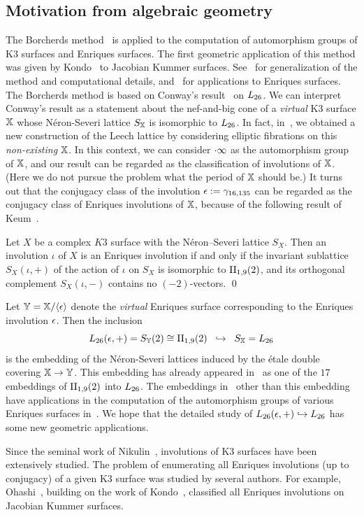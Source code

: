 \documentclass{amsart} %
\begin{document}
\subsection{Motivation from algebraic geometry}\label{subsec:alggeom}
%
The Borcherds method~\cite{MR913200, MR1654763}
is applied to the computation of automorphism groups of K3 surfaces and Enriques surfaces.
The first geometric application of this method was given 
by Kondo~\cite{MR1618132} to Jacobian Kummer surfaces.
See~\cite{MR3456710, MR4759604} for generalization of the method and computational details,
and~\cite{MR4498439, MR4389670} for applications to Enriques surfaces.
The Borcherds method is based on Conway's result~\cite{MR690711} on $L_{26}$. 
We can interpret Conway's result 
as a statement about the nef-and-big cone of a \emph{virtual} K3 surface $\mathord{\mathbb{X}}$
 whose N\'eron-Severi lattice $S_{\mathord{\mathbb{X}}}$ is isomorphic to $L_{26}$.
In fact,
in~\cite{MR4674939}, 
we obtained a new construction of the Leech lattice
by considering elliptic fibrations on this \emph{non-existing} $\mathord{\mathbb{X}}$.
In this context, we can consider $\cdot \infty$ as 
the automorphism group of $\mathord{\mathbb{X}}$,
and our result can be regarded as the classification of involutions of $\mathord{\mathbb{X}}$.
(Here we do not pursue the problem what the period of $\mathord{\mathbb{X}}$ should be.)
It turns out that 
the conjugacy class of the involution $\epsilon:=\gamma_{16, 135}$ can be regarded 
 as the conjugacy class of Enriques involutions of $\mathord{\mathbb{X}}$,
 because of the following result of Keum~\cite{MR1060704}.
 \begin{proposition}
 Let $X$ be a complex $K3$ surface
with the N\'eron--Severi lattice $S_X$.
 Then an involution $\iota$ of $X$ is an Enriques involution
 if and only if the invariant sublattice $S_X(\iota, +)$ of 
 the action of $\iota$ on $S_X$ 
 is isomorphic to $\mathrm{II}_{1,9} (2)$,
 and its orthogonal complement $S_X(\iota, -)$
contains no $(-2)$-vectors.
 \qed
 \end{proposition}
%
Let $\mathord{\mathbb{Y}}=\mathord{\mathbb{X}}/\langle {\epsilon} \rangle$ denote the \emph{virtual} Enriques surface
corresponding to the Enriques involution $\epsilon$.
Then the inclusion 
\[
L_{26}(\epsilon, +)=S_{\mathord{\mathbb{Y}}}(2)\cong \mathrm{II}_{1,9} (2)\;\; \hookrightarrow \;\;S_{\mathord{\mathbb{X}}}=L_{26}
\]
is the embedding of the N\'eron-Severi lattices
induced by the \'etale double covering $\mathord{\mathbb{X}}\to \mathord{\mathbb{Y}}$.
This embedding 
has already appeared in~\cite{MR4389670} as one of the $17$ embeddings 
of $\mathrm{II}_{1,9} (2)$ into $L_{26}$.
The embeddings in~\cite{MR4389670} other than this embedding 
have applications in the computation of the automorphism groups
of various Enriques surfaces in~\cite{MR4498439}.
We hope that the detailed study of $L_{26}(\epsilon, +)\hookrightarrow L_{26}$
has some new geometric applications.
%
\par
Since the seminal work of Nikulin~\cite{MR633160}, 
involutions of K3 surfaces have been extensively studied.
The problem of enumerating all Enriques involutions 
(up to conjugacy) of a given K3 surface was
studied by several authors.
For example, Ohashi~\cite{MR2552959},
building on the work of Kondo~\cite{MR1618132}, 
 classified all Enriques involutions on Jacobian Kummer surfaces. 
%
%
\end{document}
